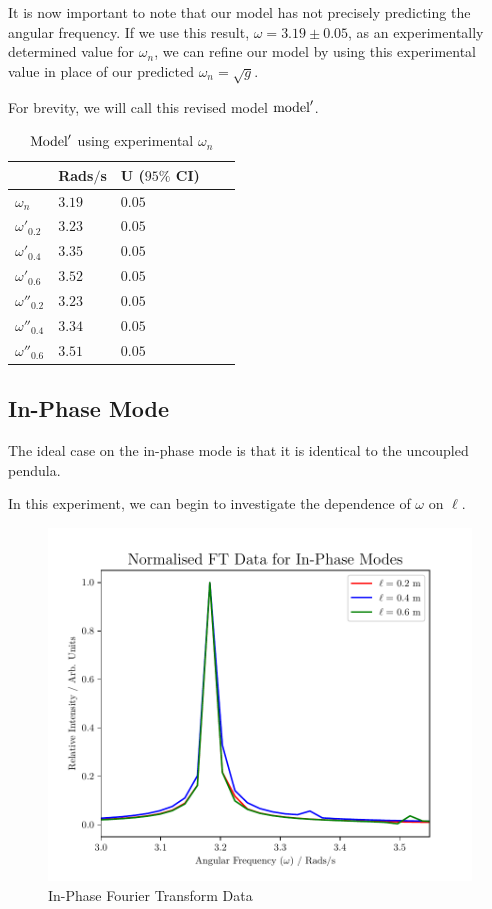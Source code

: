 \documentclass[aps,prl,reprint,10pt,amsmath,amssymb,superscriptaddress,a4paper, floatfix]{revtex4-2}
\begin{document}
It is now important to note that our model has not precisely predicting the angular frequency. If we use this result, $\omega = 3.19 \pm 0.05$, as an experimentally determined value for $\omega_n$, we can refine our model by using this experimental value in place of our predicted $ \omega_n = \sqrt{g}$.

For brevity, we will call this revised model $\textnormal{model}'$.

\begin{table}[h]
    \begin{tabular}{@{}lllll@{}}
    \toprule
                        & Rads$/$s    & U ($95 \%$ CI)  & \\ \midrule
    $\omega_n$          & $3.19$      & $0.05$          & \\ 
    $\omega'_{0.2}$     & $3.23$      & $0.05$          & \\ 
    $\omega'_{0.4}$     & $3.35$      & $0.05$          & \\
    $\omega'_{0.6}$     & $3.52$      & $0.05$          & \\ 
    $\omega''_{0.2}$    & $3.23$      & $0.05$          & \\ 
    $\omega''_{0.4}$    & $3.34$      & $0.05$          & \\
    $\omega''_{0.6}$    & $3.51$      & $0.05$          & \\ \bottomrule
    \end{tabular}
    \caption{$\textnormal{Model}'$ using experimental $\omega_n$} 
\end{table}

\subsection*{In-Phase Mode}

The ideal case on the in-phase mode is that it is identical to the uncoupled pendula.

In this experiment, we can begin to investigate the dependence of $\omega$ on $\ell$.

\begin{figure}[H]
    \includegraphics[width = 8 cm]{Normalised In-Phase FT Frequency Comparrison.pdf}
    \caption{In-Phase Fourier Transform Data}
    \label{fig:InPhase}
\end{figure}
\end{document}
